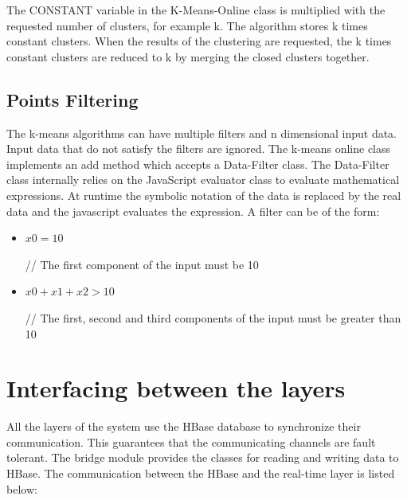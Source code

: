 \documentclass{lmproj}
\begin{document}
The CONSTANT variable in the K-Means-Online class is multiplied with the requested number of clusters, for example k. The algorithm stores k times constant clusters. When the results of the clustering are requested, the k times constant clusters are reduced to k by merging the closed clusters together.

\subsection{Points Filtering}

The k-means algorithms can have multiple filters and n dimensional input data. Input data that do not satisfy the filters are ignored. The k-means online class implements an add method which accepts a Data-Filter class. The Data-Filter class internally relies on the JavaScript evaluator class to evaluate mathematical expressions. At runtime the symbolic notation of the data is replaced by the real data and the javascript evaluates the expression. A filter can be of the form:

 \begin{itemize}
 	\item
 	\begin{minipage}[t]{0.3\linewidth}
 		$x0 = 10$
 	\end{minipage}%
 	\begin{minipage}{.7\linewidth}
		// The first component of the input must be 10
 	\end{minipage}
 
 
 	\item
 	\begin{minipage}[t]{0.3\linewidth}
	 	$x0 + x1 + x2 > 10$
 	\end{minipage}%
 	\begin{minipage}{.7\linewidth}
 		// The first, second and third components of the input must be greater than 10
 	\end{minipage}
 \end{itemize}


\section{Interfacing between the layers}

All the layers of the system use the HBase database to synchronize their communication. This guarantees that the communicating channels are fault tolerant. The bridge module provides the classes for reading and writing data to HBase. The communication between the HBase and the real-time layer is listed below:
\end{document}
